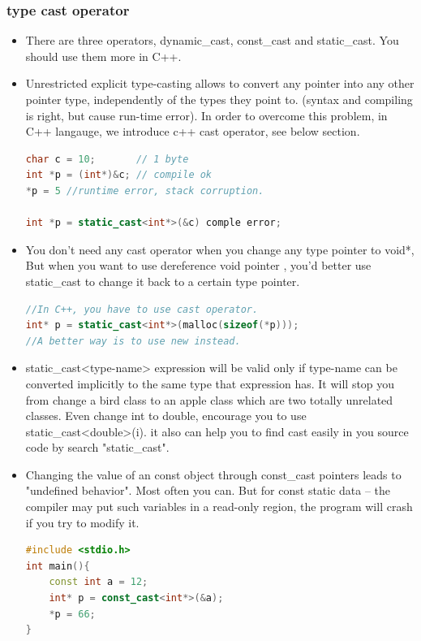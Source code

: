 \documentclass[a4paper,12pt,twoside]{book}
\begin{document}
\subsubsection{type cast operator}
\begin{itemize}
\item There are three operators, dynamic\_cast, const\_cast and static\_cast. You should use them more in C++.

\item Unrestricted explicit type-casting allows to convert any pointer into any other pointer type, independently of the types they point to.  (syntax and compiling is right, but cause run-time error). In order to overcome this problem,  in C++ langauge, we introduce c++ cast operator, see below section.
\begin{lstlisting}[frame=single, language=c++]
char c = 10;       // 1 byte
int *p = (int*)&c; // compile ok
*p = 5 //runtime error, stack corruption.

int *p = static_cast<int*>(&c) comple error;
\end{lstlisting}

\item You don't need any cast operator when you change any type pointer to void*, But when you want to use dereference void pointer , you'd better use static\_cast to change it back to a certain type pointer.
\begin{lstlisting}[frame=single, language=c++]
//In C++, you have to use cast operator.
int* p = static_cast<int*>(malloc(sizeof(*p)));
//A better way is to use new instead.
\end{lstlisting}

\item    static\_cast<type-name> expression will be valid only if type-name can be converted implicitly to the same type that expression has.  It will stop you from change a bird class to an apple class which  are two totally unrelated classes.  Even change int to double, encourage you to use static\_cast<double>(i).  it also can help you to find cast easily in you source code by search "static\_cast".

\item Changing the value of an const object through const\_cast pointers leads to  "undefined behavior". Most often you can. But for const static data -- the compiler may put such variables in a read-only region, the program will crash if you try to modify it.

\begin{lstlisting}[frame=single, language=c++]
#include <stdio.h>
int main(){
    const int a = 12;
    int* p = const_cast<int*>(&a);
    *p = 66;
}
\end{lstlisting}


\end{itemize}
\end{document}
